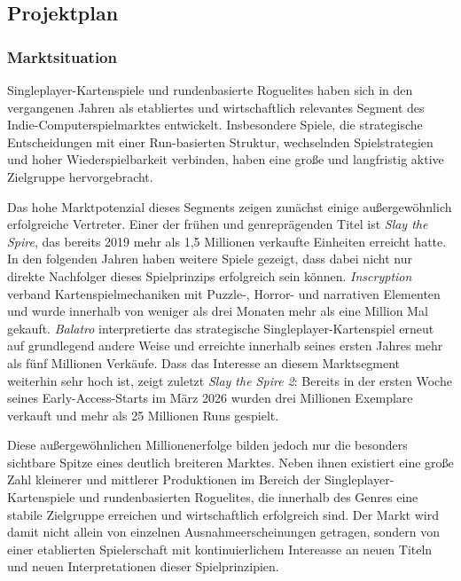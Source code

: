 \subsection{Projektplan}


\subsubsection{Marktsituation}

Singleplayer-Kartenspiele und rundenbasierte Roguelites haben sich in den vergangenen Jahren als etabliertes und wirtschaftlich relevantes Segment des Indie-Computerspielmarktes entwickelt.
Insbesondere Spiele, die strategische Entscheidungen mit einer Run-basierten Struktur, wechselnden Spielstrategien und hoher Wiederspielbarkeit verbinden, haben eine große und langfristig aktive Zielgruppe hervorgebracht.

Das hohe Marktpotenzial dieses Segments zeigen zunächst einige außergewöhnlich erfolgreiche Vertreter.
Einer der frühen und genreprägenden Titel ist \emph{Slay the Spire}, das bereits 2019 mehr als 1,5 Millionen verkaufte Einheiten erreicht hatte.
In den folgenden Jahren haben weitere Spiele gezeigt, dass dabei nicht nur direkte Nachfolger dieses Spielprinzips erfolgreich sein können.
\emph{Inscryption} verband Kartenspielmechaniken mit Puzzle-, Horror- und narrativen Elementen und wurde innerhalb von weniger als drei Monaten mehr als eine Million Mal gekauft.
\emph{Balatro} interpretierte das strategische Singleplayer-Kartenspiel erneut auf grundlegend andere Weise und erreichte innerhalb seines ersten Jahres mehr als fünf Millionen Verkäufe.
Dass das Interesse an diesem Marktsegment weiterhin sehr hoch ist, zeigt zuletzt \emph{Slay the Spire 2}: Bereits in der ersten Woche seines Early-Access-Starts im März 2026 wurden drei Millionen Exemplare verkauft und mehr als 25 Millionen Runs gespielt.

Diese außergewöhnlichen Millionenerfolge bilden jedoch nur die besonders sichtbare Spitze eines deutlich breiteren Marktes.
Neben ihnen existiert eine große Zahl kleinerer und mittlerer Produktionen im Bereich der Singleplayer-Kartenspiele und rundenbasierten Roguelites, die innerhalb des Genres eine stabile Zielgruppe erreichen und wirtschaftlich erfolgreich sind.
Der Markt wird damit nicht allein von einzelnen Ausnahmeerscheinungen getragen, sondern von einer etablierten Spielerschaft mit kontinuierlichem Intereasse an neuen Titeln und neuen Interpretationen dieser Spielprinzipien.

